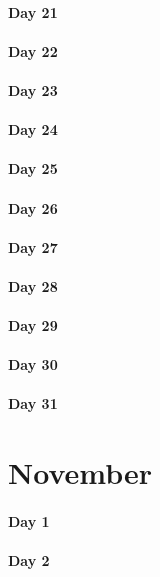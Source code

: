 \documentclass[UTF8,a4paper,8pt]{ctexart}
\begin{document}
 	 \paragraph{Day 21      \quad     }
 	 \paragraph{Day 22      \quad     }
 	 \paragraph{Day 23      \quad     }
 	 \paragraph{Day 24      \quad     }
 	 \paragraph{Day 25      \quad     }
 	 \paragraph{Day 26      \quad     }
 	 \paragraph{Day 27      \quad     }
 	 \paragraph{Day 28      \quad     }
 	 \paragraph{Day 29      \quad     }   
 	 \paragraph{Day 30      \quad     }
 	 \paragraph{Day 31      \quad     }
\section{November}
 	 \paragraph{Day 1       \quad     }
 	 \paragraph{Day 2       \quad     }
\end{document}
